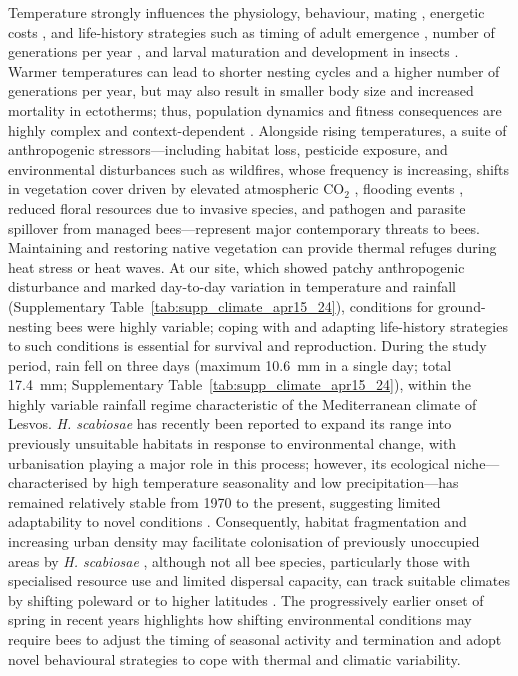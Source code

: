 \documentclass[11pt,a4paper]{article}
\begin{document}
Temperature strongly influences the physiology, behaviour, mating \citep{Larsson1991}, energetic costs \citep{Kearney2009}, and life-history strategies such as timing of adult emergence \citep{Forrest2017}, number of generations per year \citep{Forrest2019}, and larval maturation and development in insects \citep{Borrell2004, Grafton2005, Woods2005}. Warmer temperatures can lead to shorter nesting cycles and a higher number of generations per year, but may also result in smaller body size and increased mortality in ectotherms; thus, population dynamics and fitness consequences are highly complex and context-dependent \citep{Kingsolver2008, Forrest2017}. Alongside rising temperatures, a suite of anthropogenic stressors—including habitat loss, pesticide exposure, and environmental disturbances such as wildfires, whose frequency is increasing, shifts in vegetation cover driven by elevated atmospheric CO$_2$ \citep{Hoffmann2002}, flooding events \citep{Roubik1980, Potts2016}, reduced floral resources due to invasive species, and pathogen and parasite spillover from managed bees—represent major contemporary threats to bees. Maintaining and restoring native vegetation can provide thermal refuges during heat stress or heat waves. At our site, which showed patchy anthropogenic disturbance and marked day-to-day variation in temperature and rainfall (Supplementary Table~\ref{tab:supp_climate_apr15_24}), conditions for ground-nesting bees were highly variable; coping with and adapting life-history strategies to such conditions is essential for survival and reproduction. During the study period, rain fell on three days (maximum 10.6~mm in a single day; total 17.4~mm; Supplementary Table~\ref{tab:supp_climate_apr15_24}), within the highly variable rainfall regime characteristic of the Mediterranean climate of Lesvos. \textit{H. scabiosae} has recently been reported to expand its range into previously unsuitable habitats in response to environmental change, with urbanisation playing a major role in this process; however, its ecological niche—characterised by high temperature seasonality and low precipitation—has remained relatively stable from 1970 to the present, suggesting limited adaptability to novel conditions \citep{Gil2024}. Consequently, habitat fragmentation and increasing urban density \citep{Lanner2022, Polidori2021} may facilitate colonisation of previously unoccupied areas by \textit{H. scabiosae} \citep{Gil2024}, although not all bee species, particularly those with specialised resource use and limited dispersal capacity, can track suitable climates by shifting poleward or to higher latitudes \citep{Kerr2015, MartinezLopez2021, Casey2015, Nemesio2016, Buckner2022}. The progressively earlier onset of spring in recent years highlights how shifting environmental conditions may require bees to adjust the timing of seasonal activity and termination \citep{Kearney2009} and adopt novel behavioural strategies to cope with thermal and climatic variability. 
\end{document}
